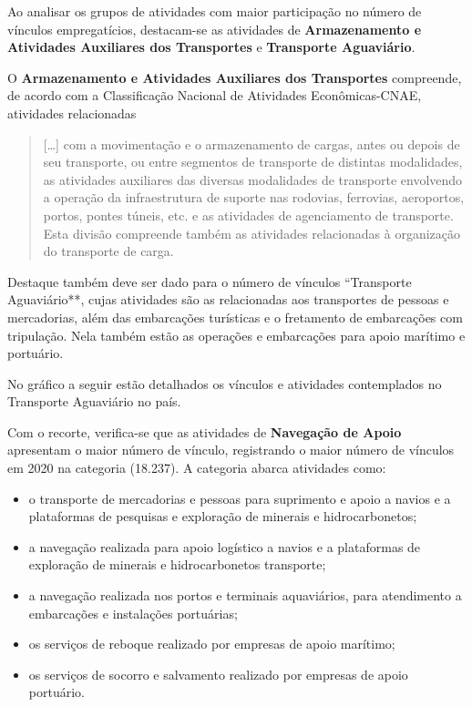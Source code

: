 \documentclass[
]{article}
\begin{document}
Ao analisar os grupos de atividades com maior participação no número de
vínculos empregatícios, destacam-se as atividades de
\textbf{Armazenamento e Atividades Auxiliares dos Transportes} e
\textbf{Transporte Aguaviário}.

O \textbf{Armazenamento e Atividades Auxiliares dos Transportes}
compreende, de acordo com a Classificação Nacional de Atividades
Econômicas-CNAE, atividades relacionadas

\begin{quote}
{[}\ldots{]} com a movimentação e o armazenamento de cargas, antes ou
depois de seu transporte, ou entre segmentos de transporte de distintas
modalidades, as atividades auxiliares das diversas modalidades de
transporte envolvendo a operação da infraestrutura de suporte nas
rodovias, ferrovias, aeroportos, portos, pontes túneis, etc. e as
atividades de agenciamento de transporte. Esta divisão compreende também
as atividades relacionadas à organização do transporte de carga.
\end{quote}

Destaque também deve ser dado para o número de vínculos ``Transporte
Aguaviário**, cujas atividades são as relacionadas aos transportes de
pessoas e mercadorias, além das embarcações turísticas e o fretamento de
embarcações com tripulação. Nela também estão as operações e embarcações
para apoio marítimo e portuário.

No gráfico a seguir estão detalhados os vínculos e atividades
contemplados no Transporte Aguaviário no país.

Com o recorte, verifica-se que as atividades de \textbf{Navegação de
Apoio} apresentam o maior número de vínculo, registrando o maior número
de vínculos em 2020 na categoria (18.237). A categoria abarca atividades
como:

\begin{itemize}
\item
  o transporte de mercadorias e pessoas para suprimento e apoio a navios
  e a plataformas de pesquisas e exploração de minerais e
  hidrocarbonetos;
\item
  a navegação realizada para apoio logístico a navios e a plataformas de
  exploração de minerais e hidrocarbonetos transporte;
\item
  a navegação realizada nos portos e terminais aquaviários, para
  atendimento a embarcações e instalações portuárias;
\item
  os serviços de reboque realizado por empresas de apoio marítimo;
\item
  os serviços de socorro e salvamento realizado por empresas de apoio
  portuário.
\end{itemize}
\end{document}
